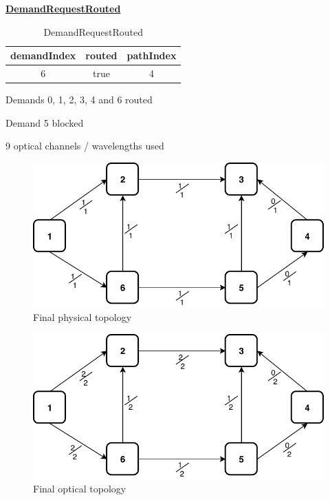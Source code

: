 \underline{\textbf{DemandRequestRouted}}

\begin{table}[H]
	\centering
	\begin{tabular}{| c | c | c |}
		\hline
		\textbf{demandIndex} & \textbf{routed}  & \textbf{pathIndex}\\ \hline
		6                    & true             & 4                 \\ \hline
	\end{tabular}
	\caption{DemandRequestRouted}
	\label{demand_request_routed}
\end{table}

Demands 0, 1, 2, 3, 4 and 6 routed\par
Demand 5 blocked \

9 optical channels / wavelengths used\\

\begin{figure}[h!]
	\centering
	\includegraphics[width=13cm]{sdf/heuristic/opaque/figures/final_physical_ex}
	\caption{Final physical topology}
	\label{final_physical_ex}
\end{figure}


\begin{figure}[h!]
	\centering
	\includegraphics[width=13cm]{sdf/heuristic/opaque/figures/final_optical_ex}
	\caption{Final optical topology}
	\label{final_optical_ex}
\end{figure}

